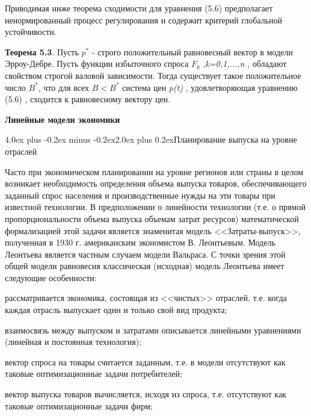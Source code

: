 \documentclass[12pt, 4paper]{book}
\makeatletter
\renewcommand{\section}{\@startsection{section}{1}{1pt}%
	{4.0ex plus -0.2ex minus -0.2ex}{2.0ex plus 0.2ex}{\centering\bf}}%
\makeatother
\begin{document}
{Приводимая ниже теорема сходимости для уравнения (5.6) предполагает ненормированный процесс регулирования и содержит критерий глобальной устойчивости.
\par

\textbf{Теорема 5.3}. Пусть $p^{*}$ - строго положительный равновесный вектор в модели Эрроу-Дебре. Пусть функции избыточного спроса $F_k$ ,\textit{k=0,1,...,n} , обладают свойством строгой валовой зависимости. Тогда существует такое положительное число  $B^{*}$, что для всех $B < B^{*}$ система цен \textit{p(t)} , удовлетворяющая уравнению (5.6) , сходится к равновесному вектору цен.
\newpage
\begin{center}
\textbf{Линейные модели экономики}
\end{center}
\begin{center}
\section{Планирование выпуска на уровне отраслей}
\end{center}
\par

Часто при экономическом планировании на уровне регионов или страны в целом возникает необходимость определения объема выпуска товаров, обеспечивающего заданный спрос населения и производственные нужды на эти товары при известной технологии. В предположении о линейности технологии (т.е. о прямой пропорциональности объема выпуска объемам затрат ресурсов) математической формализацией этой задачи является знаменитая модель <<Затраты-выпуск>>, полученная в 1930 г. американским экономистом В. Леонтьевым. Модель Леонтьева является частным случаем модели Вальраса. С точки зрения этой общей модели равновесия классическая (исходная) модель Леонтьева имеет следующие особенности:
\par

рассматривается экономика, состоящая из <<чистых>> отраслей, т.е. когда каждая отрасль выпускает один и только свой вид продукта;
\par

взаимосвязь между выпуском и затратами описывается линейными уравнениями (линейная и постоянная технология);
\par

вектор спроса на товары считается заданным, т.е. в модели отсутствуют как таковые оптимизационные задачи потребителей;
\par

вектор выпуска товаров вычисляется, исходя из спроса, т.е. отсутствуют как таковые оптимизационные задачи фирм;
\par

}
\end{document}

